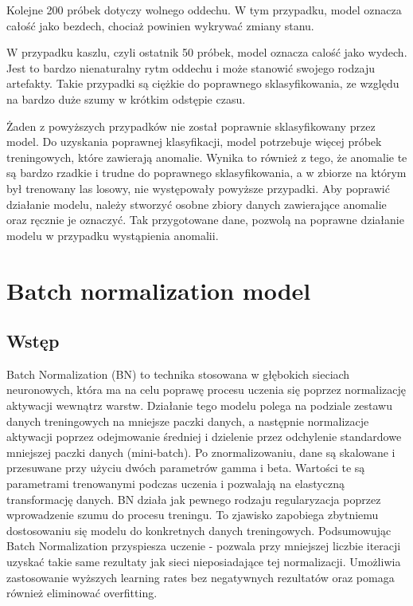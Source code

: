 \documentclass{article}
\begin{document}
Kolejne 200 próbek dotyczy wolnego oddechu. W tym przypadku, model oznacza całość jako bezdech, chociaż powinien wykrywać zmiany stanu. 

W przypadku kaszlu, czyli ostatnik 50 próbek, model oznacza calość jako wydech. Jest to bardzo nienaturalny rytm oddechu i może stanowić swojego rodzaju artefakty. Takie przypadki są ciężkie do poprawnego sklasyfikowania, ze względu na bardzo duże szumy w krótkim odstępie czasu.

Żaden z powyższych przypadków nie został poprawnie sklasyfikowany przez model. Do uzyskania poprawnej klasyfikacji, model potrzebuje więcej próbek treningowych, które zawierają anomalie. Wynika to również z tego, że anomalie te są bardzo rzadkie i trudne do poprawnego sklasyfikowania, a w zbiorze na którym był trenowany las losowy, nie występowały powyższe przypadki. Aby poprawić działanie modelu, należy stworzyć osobne zbiory danych zawierające anomalie oraz ręcznie je oznaczyć. Tak przygotowane dane, pozwolą na poprawne działanie modelu w przypadku wystąpienia anomalii.

\section{Batch normalization model}

\subsection{Wstęp}

Batch Normalization (BN) to technika stosowana w głębokich sieciach neuronowych, która ma na celu poprawę procesu uczenia się poprzez normalizację aktywacji wewnątrz warstw. Działanie tego modelu polega na podziale zestawu danych treningowych na mniejsze paczki danych, a następnie normalizacje aktywacji poprzez odejmowanie średniej i dzielenie przez odchylenie standardowe mniejszej paczki danych (mini-batch). Po znormalizowaniu, dane są skalowane i przesuwane przy użyciu dwóch parametrów gamma i beta. Wartości te są parametrami trenowanymi podczas uczenia i pozwalają na elastyczną transformację danych. BN działa jak pewnego rodzaju regularyzacja poprzez wprowadzenie szumu do procesu treningu. To zjawisko zapobiega zbytniemu dostosowaniu się modelu do konkretnych danych treningowych. Podsumowując Batch Normalization przyspiesza uczenie - pozwala przy mniejszej liczbie iteracji uzyskać takie same rezultaty jak sieci nieposiadające tej normalizacji. Umożliwia zastosowanie wyższych learning rates bez negatywnych rezultatów oraz pomaga również eliminować overfitting.
\end{document}
